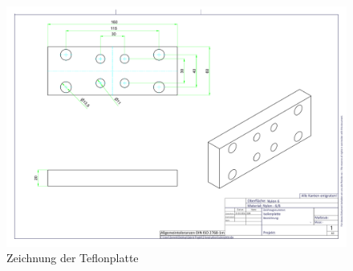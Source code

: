 \begin{figure}[h!]
	\includegraphics[width=\textwidth]{../ref/Isolierplatte.pdf}
	\caption{Zeichnung der Teflonplatte}
	\label{fig:Teflonplatte-Zeichnung}
\end{figure}